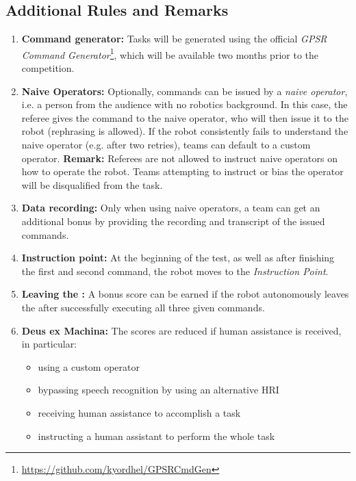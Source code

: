 \subsection*{Additional Rules and Remarks}
\begin{enumerate}[nosep]
	\item \textbf{Command generator:} Tasks will be generated using the official \emph{GPSR Command Generator}\footnote{\url{https://github.com/kyordhel/GPSRCmdGen}}, which will be available two months prior to the competition.

	\item \textbf{Naive Operators:} Optionally, commands can be issued by a \emph{naive operator}, i.e. a person from the audience with no robotics background.
	In this case, the referee gives the command to the naive operator, who will then issue it to the robot (rephrasing is allowed).
	If the robot consistently fails to understand the naive operator (e.g. after two retries), teams can default to a custom operator.
	\textbf{Remark:} Referees are not allowed to instruct naive operators on how to operate the robot.
	Teams attempting to instruct or bias the operator will be disqualified from the task.

	\item \textbf{Data recording:} Only when using naive operators, a team can get an additional bonus by providing the recording and transcript of the issued commands.

	\item \textbf{Instruction point:} At the beginning of the test, as well as after finishing the first and second command, the robot moves to the \textit{Instruction Point}.

	\item \textbf{Leaving the \Arena{}:} A bonus score can be earned if the robot autonomously leaves the \Arena{} after successfully executing all three given commands.

	\item \textbf{Deus ex Machina:} The scores are reduced if human assistance is received, in particular:
	\begin{itemize}
		\item using a custom operator
		\item bypassing speech recognition by using an alternative HRI
		\item receiving human assistance to accomplish a task
		\item instructing a human assistant to perform the whole task
	\end{itemize}
\end{enumerate}

